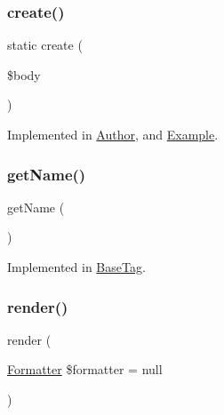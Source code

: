 \subsubsection{\texorpdfstring{create()}{create()}}
{\footnotesize\ttfamily static create (\begin{DoxyParamCaption}\item[{}]{\$body }\end{DoxyParamCaption})\hspace{0.3cm}{\ttfamily [static]}}



Implemented in \mbox{\hyperlink{classphp_documentor_1_1_reflection_1_1_doc_block_1_1_tags_1_1_author_a322bfa4cad4fbe7364f4ab65c8f8588c}{Author}}, and \mbox{\hyperlink{classphp_documentor_1_1_reflection_1_1_doc_block_1_1_tags_1_1_example_a322bfa4cad4fbe7364f4ab65c8f8588c}{Example}}.

\mbox{\label{interfacephp_documentor_1_1_reflection_1_1_doc_block_1_1_tag_a3d0963e68bb313b163a73f2803c64600}} 
\subsubsection{\texorpdfstring{get\+Name()}{getName()}}
{\footnotesize\ttfamily get\+Name (\begin{DoxyParamCaption}{ }\end{DoxyParamCaption})}



Implemented in \mbox{\hyperlink{classphp_documentor_1_1_reflection_1_1_doc_block_1_1_tags_1_1_base_tag_a3d0963e68bb313b163a73f2803c64600}{Base\+Tag}}.

\mbox{\label{interfacephp_documentor_1_1_reflection_1_1_doc_block_1_1_tag_ac20fbfe3216d76776b5e743bd16427f9}} 
\subsubsection{\texorpdfstring{render()}{render()}}
{\footnotesize\ttfamily render (\begin{DoxyParamCaption}\item[{\mbox{\hyperlink{interfacephp_documentor_1_1_reflection_1_1_doc_block_1_1_tags_1_1_formatter}{Formatter}}}]{\$formatter = {\ttfamily null} }\end{DoxyParamCaption})}



